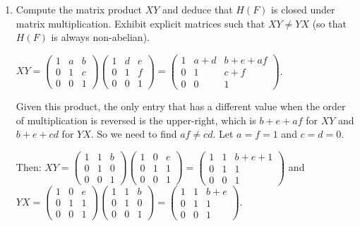 \documentclass{article}
\begin{document}
\begin{enumerate}[label=(\alph*)]
    \item Compute the matrix product $XY$ and deduce that $H(F)$ is closed under matrix multiplication. Exhibit explicit matrices such that $XY \neq YX$ (so that $H(F)$ is always non-abelian).

          $XY = \begin{pmatrix}1 & a & b \\ 0 & 1 & c \\ 0 & 0 & 1\end{pmatrix}\begin{pmatrix}1 & d & e \\ 0 & 1 & f \\ 0 & 0 & 1\end{pmatrix} = \begin{pmatrix}1 & a + d & b + e + af \\ 0 & 1 & c + f \\ 0 & 0 & 1\end{pmatrix}$.

          Given this product, the only entry that has a different value when the order of multiplication is reversed is the upper-right, which is $b + e + af$ for $XY$ and $b + e + cd$ for $YX$. So we need to find $af \neq cd$. Let $a = f = 1$ and $c = d = 0$.

          Then:\newline
          $XY = \begin{pmatrix}1 & 1 & b \\ 0 & 1 & 0 \\ 0 & 0 & 1\end{pmatrix}\begin{pmatrix}1 & 0 & e \\ 0 & 1 & 1 \\ 0 & 0 & 1\end{pmatrix} = \begin{pmatrix}1 & 1 & b + e + 1 \\ 0 & 1 & 1 \\ 0 & 0 & 1\end{pmatrix}$ and \newline
          $YX = \begin{pmatrix}1 & 0 & e \\ 0 & 1 & 1 \\ 0 & 0 & 1\end{pmatrix}\begin{pmatrix}1 & 1 & b \\ 0 & 1 & 0 \\ 0 & 0 & 1\end{pmatrix} = \begin{pmatrix}1 & 1 & b + e \\ 0 & 1 & 1 \\ 0 & 0 & 1\end{pmatrix}$.


\end{enumerate}
\end{document}
